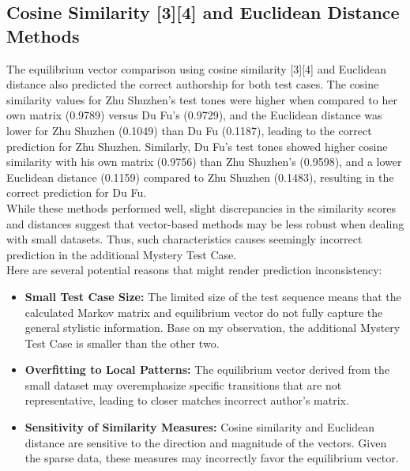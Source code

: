 \documentclass[12pt]{article}
\begin{document}
\subsection*{Cosine Similarity [3][4] and Euclidean Distance Methods}
The equilibrium vector comparison using cosine similarity [3][4] and Euclidean distance also predicted the correct authorship for both test cases. 
The cosine similarity values for Zhu Shuzhen's test tones were higher when compared to her own matrix (0.9789) versus Du Fu’s (0.9729), and the Euclidean distance was lower for Zhu Shuzhen (0.1049) than Du Fu (0.1187), leading to the correct prediction for Zhu Shuzhen. 
Similarly, Du Fu's test tones showed higher cosine similarity with his own matrix (0.9756) than Zhu Shuzhen's (0.9598), and a lower Euclidean distance (0.1159) compared to Zhu Shuzhen (0.1483), resulting in the correct prediction for Du Fu.
\\
While these methods performed well, slight discrepancies in the similarity scores and distances suggest that vector-based methods may be less robust when dealing with small datasets.
Thus, such characteristics causes seemingly incorrect prediction in the additional Mystery Test Case.
\\
\noindent Here are several potential reasons that might render prediction inconsistency:
\begin{itemize}
    \item \textbf{Small Test Case Size:} The limited size of the test sequence means that the calculated Markov matrix and equilibrium vector do not fully capture the general stylistic information. Base on my observation, the additional Mystery Test Case is smaller than the other two.
    \item \textbf{Overfitting to Local Patterns:} The equilibrium vector derived from the small dataset may overemphasize specific transitions that are not representative, leading to closer matches incorrect author's matrix.
    \item \textbf{Sensitivity of Similarity Measures:} Cosine similarity and Euclidean distance are sensitive to the direction and magnitude of the vectors. Given the sparse data, these measures may incorrectly favor the equilibrium vector.
\end{itemize}
\end{document}

